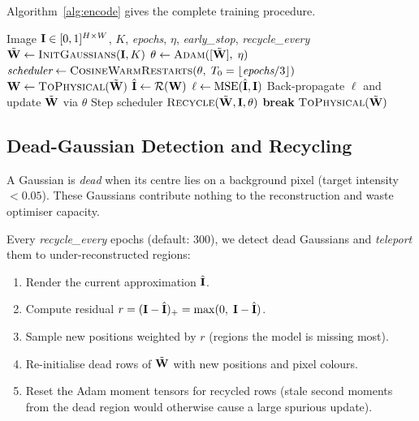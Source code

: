 Algorithm~\ref{alg:encode} gives the complete training procedure.

\begin{algorithm}[ht]
\caption{Gaussian encoder for a single image}
\label{alg:encode}
\begin{algorithmic}[1]
\Require Image $\mathbf{I} \in [0,1]^{H \times W}$, $K$, \textit{epochs}, $\eta$,
         \textit{early\_stop}, \textit{recycle\_every}
\State $\tilde{\mathbf{W}} \leftarrow \textsc{InitGaussians}(\mathbf{I}, K)$
\State $\theta \leftarrow \textsc{Adam}([\tilde{\mathbf{W}}],\; \eta)$
\State $\textit{scheduler} \leftarrow \textsc{CosineWarmRestarts}(\theta,\; T_0=\lfloor\textit{epochs}/3\rfloor)$
  \State $\mathbf{W} \leftarrow \textsc{ToPhysical}(\tilde{\mathbf{W}})$
  \State $\hat{\mathbf{I}} \leftarrow \mathcal{R}(\mathbf{W})$
  \State $\ell \leftarrow \mathrm{MSE}(\hat{\mathbf{I}}, \mathbf{I})$
  \State Back-propagate $\ell$ and update $\tilde{\mathbf{W}}$ via $\theta$
  \State Step scheduler
    \State $\textsc{Recycle}(\tilde{\mathbf{W}}, \mathbf{I}, \theta)$
  \EndIf
   \textbf{break} \EndIf
\EndFor
\State \Return $\textsc{ToPhysical}(\tilde{\mathbf{W}})$
\end{algorithmic}
\end{algorithm}

\subsection{Dead-Gaussian Detection and Recycling}
\label{sec:recycling}

A Gaussian is \emph{dead} when its centre lies on a background pixel
(target intensity $< 0.05$).  These Gaussians contribute nothing to the
reconstruction and waste optimiser capacity.

Every \textit{recycle\_every} epochs (default: $300$), we detect dead Gaussians
and \emph{teleport} them to under-reconstructed regions:

\begin{enumerate}[leftmargin=2em]
  \item Render the current approximation $\hat{\mathbf{I}}$.
  \item Compute residual $r = (\mathbf{I} - \hat{\mathbf{I}})_+ = \max(0,\;\mathbf{I} - \hat{\mathbf{I}})$.
  \item Sample new positions weighted by $r$ (regions the model is missing most).
  \item Re-initialise dead rows of $\tilde{\mathbf{W}}$ with new positions and pixel colours.
  \item Reset the Adam moment tensors for recycled rows (stale second moments
        from the dead region would otherwise cause a large spurious update).
\end{enumerate}

